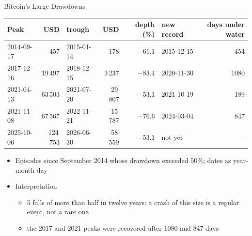 \begin{frame}{Bitcoin's Large Drawdowns}
\itemsize{\footnotesize}
\begin{center}
\scriptsize
\begin{tabular}{lrlrrlr}
\toprule
Peak & USD & trough & USD & depth (\%) & new record & days under water \\
\midrule
2014-09-17 & 457 & 2015-01-14 & 178 & $-61.1$ & 2015-12-15 & 454 \\
2017-12-16 & 19\,497 & 2018-12-15 & 3\,237 & $-83.4$ & 2020-11-30 & 1080 \\
2021-04-13 & 63\,503 & 2021-07-20 & 29\,807 & $-53.1$ & 2021-10-19 & 189 \\
2021-11-08 & 67\,567 & 2022-11-21 & 15\,787 & $-76.6$ & 2024-03-04 & 847 \\
2025-10-06 & 124\,753 & 2026-06-30 & 58\,559 & $-53.1$ & not yet & -- \\
\bottomrule
\end{tabular}
\end{center}
\begin{itemize}
    \item Episodes since September 2014 whose drawdown exceeded 50\%; dates as year-month-day
    \item Interpretation
    \begin{itemize}
        \item 5 falls of more than half in twelve years: a crash of this size is a regular event, not a rare one
        \item the 2017 and 2021 peaks were recovered after 1080 and 847 days
    \end{itemize}
\end{itemize}
\end{frame}


